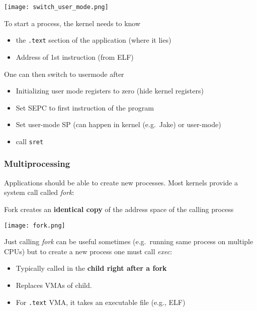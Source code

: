 \newpar{}
\begin{center}
    \texttt{[image: switch\_user\_mode.png]}
\end{center}
To start a process, the kernel needs to know
\begin{itemize}
    \item the \texttt{.text} section of the application (where it lies)
    \item Address of 1st instruction (from ELF)
\end{itemize}
One can then switch to usermode after
\begin{itemize}
    \item Initializing user mode registers to zero (hide kernel registers)
    \item Set SEPC to first instruction of the program
    \item Set user-mode SP (can happen in kernel (e.g.\ Jake) or user-mode)
    \item call \texttt{sret}
\end{itemize}

\subsubsection{Multiprocessing}
Applications should be able to create new processes. Most kernels provide a system call called \textit{fork}:

\newpar{}
Fork creates an \textbf{identical copy} of the address space of the calling process
\begin{center}
    \texttt{[image: fork.png]}
\end{center}

Just calling \textit{fork} can be useful sometimes (e.g.\ running same process on multiple CPUs) but to create a new process one must call \textit{exec}:

\begin{itemize}
    \item Typically called in the \textbf{child right after a fork}
    \item Replaces VMAs of child. 
    \item For \texttt{.text} VMA, it takes an executable file (e.g., ELF)
\end{itemize}

\newpar{}

